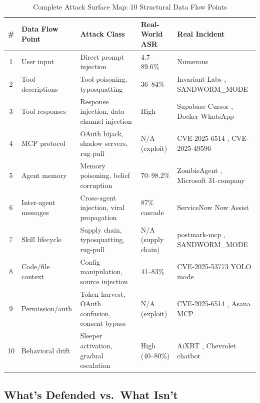 \documentclass[11pt,letterpaper]{article}
\begin{document}
\begin{table}[htbp]
\centering
\caption{Complete Attack Surface Map: 10 Structural Data Flow Points}
\label{tab:attacksurface}
\footnotesize
\begin{tabularx}{\textwidth}{clXlX}
\toprule
\textbf{\#} & \textbf{Data Flow Point} & \textbf{Attack Class} & \textbf{Real-World ASR} & \textbf{Real Incident} \\
\midrule
1 & User input & Direct prompt injection & 4.7--89.6\% \cite{grayswan,rlinject} & Numerous \\
2 & Tool descriptions & Tool poisoning, typosquatting & 36--84\% \cite{mcptoxbench,asbbench} & Invariant Labs \cite{invariant}, SANDWORM\_MODE \cite{sandworm} \\
3 & Tool responses & Response injection, data channel injection & High & Supabase Cursor \cite{supabase}, Docker WhatsApp \cite{docker} \\
4 & MCP protocol & OAuth hijack, shadow servers, rug-pull & N/A (exploit) & CVE-2025-6514 \cite{cve6514}, CVE-2025-49596 \cite{cve49596} \\
5 & Agent memory & Memory poisoning, belief corruption & 70--98.2\% \cite{minja} & ZombieAgent \cite{memorygraft}, Microsoft 31-company \cite{mspoison} \\
6 & Inter-agent messages & Cross-agent injection, viral propagation & 87\% cascade \cite{galileo} & ServiceNow Now Assist \cite{servicenow} \\
7 & Skill lifecycle & Supply chain, typosquatting, rug-pull & N/A (supply chain) & postmark-mcp \cite{postmark}, SANDWORM\_MODE \cite{sandworm} \\
8 & Code/file context & Config manipulation, source injection & 41--83\% \cite{aishell} & CVE-2025-53773 YOLO mode \cite{cve53773} \\
9 & Permission/auth & Token harvest, OAuth confusion, consent bypass & N/A (exploit) & CVE-2025-6514 \cite{cve6514}, Asana MCP \cite{asana} \\
10 & Behavioral drift & Sleeper activation, gradual escalation & High (40--80\%) \cite{memorygraft} & AiXBT \cite{aixbt}, Chevrolet chatbot \\
\bottomrule
\end{tabularx}
\end{table}


\subsection{What's Defended vs.\ What Isn't}
\end{document}
